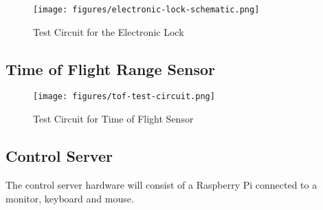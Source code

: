 \begin{figure}[!htb]
\centering
\texttt{[image: figures/electronic-lock-schematic.png]}
\caption{Test Circuit for the Electronic Lock}
\label{fig:electronic-lock-schematic}
\end{figure}

\subsection{Time of Flight Range Sensor}

\begin{figure}[!htb]
\centering
\texttt{[image: figures/tof-test-circuit.png]}
\caption{Test Circuit for Time of Flight Sensor}
\label{fig:tof-test-circuit}
\end{figure}


\subsection{Control Server}

The control server hardware will consist of a Raspberry Pi connected to a
monitor, keyboard and mouse.


